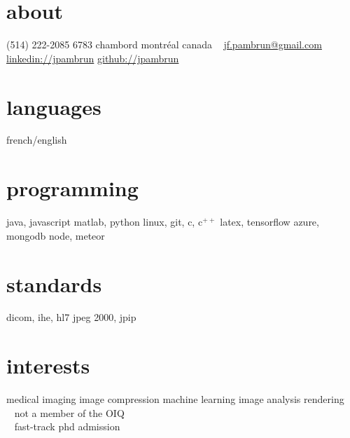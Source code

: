 \documentclass[print]{friggeri-cv}
\begin{document}

\newcommand{\eletr}{\href{http://www.etsmtl.ca/Programmes-Etudes/1er-cycle/Fiche-de-cours?Sigle=ELE747}{ele{\footnotesize747}}}
\newcommand{\eleenv}{\href{http://www.etsmtl.ca/Programmes-Etudes/1er-cycle/Fiche-de-cours?Sigle=ELE116}{ele{\footnotesize116}}}
\newcommand{\infmat}{\href{http://www.polymtl.ca/etudes/cours/details.php?sigle=INF1005a}{inf{\footnotesize1005}a}}
\newcommand{\gtssys}{\href{http://www.etsmtl.ca/Futurs-etudiants/Cycles-sup/Fiche-de-cours?Sigle=GTS840}{gts{\footnotesize840}}}

\begin{aside}
  \section{about}
  {\small(514) 222-2085}
  {\small6783} chambord
  montréal
  canada
  ~
  \href{mailto:jf.pambrun@gmail.com}{jf.pambrun@gmail.com}
  \href{https://ca.linkedin.com/in/jpambrun}{linkedin://jpambrun}
  \href{http://github.com/jpambrun}{github://jpambrun}
  \section{languages}
  french/english
  \section{programming}
  java, javascript
  matlab, python
  linux, git, c, c{\tiny$^{++}$}
  latex, tensorflow
  azure, mongodb
  node, meteor
  \section{standards}
  dicom, ihe, hl{\small7}
  jpeg {\small2000}, jpip
  \section{interests}
  medical imaging
  image compression
  machine learning
  image analysis
  rendering
  ~\vspace{2cm}
  {\footnotesize\textdagger~ not a member of the OIQ\\\textdaggerdbl~ fast-track phd admission}
\end{aside}

\end{document}
